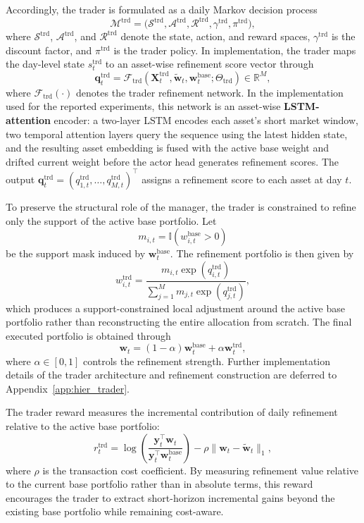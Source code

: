 \documentclass[letterpaper]{article} %
\begin{document}
Accordingly, the trader is formulated as a daily Markov decision process
\[
\mathcal{M}^{\mathrm{trd}}
=
\bigl(
\mathcal{S}^{\mathrm{trd}},
\mathcal{A}^{\mathrm{trd}},
\mathcal{R}^{\mathrm{trd}},
\gamma^{\mathrm{trd}},
\pi^{\mathrm{trd}}
\bigr),
\]
where \(\mathcal{S}^{\mathrm{trd}}\), \(\mathcal{A}^{\mathrm{trd}}\), and \(\mathcal{R}^{\mathrm{trd}}\) denote the state, action, and reward spaces, \(\gamma^{\mathrm{trd}}\) is the discount factor, and \(\pi^{\mathrm{trd}}\) is the trader policy. In implementation, the trader maps the day-level state \(s_t^{\mathrm{trd}}\) to an asset-wise refinement score vector through
\[
\mathbf{q}_t^{\mathrm{trd}}
=
\mathcal{F}_{\mathrm{trd}}
\!\left(
\mathbf{X}_t^{\mathrm{trd}},\tilde{\mathbf{w}}_t,\mathbf{w}_t^{\mathrm{base}};
\Theta_{\mathrm{trd}}
\right)
\in\mathbb{R}^{M},
\]
where \(\mathcal{F}_{\mathrm{trd}}(\cdot)\) denotes the trader refinement network. In the implementation used for the reported experiments, this network is an asset-wise \textbf{LSTM-attention} encoder: a two-layer LSTM encodes each asset's short market window, two temporal attention layers query the sequence using the latest hidden state, and the resulting asset embedding is fused with the active base weight and drifted current weight before the actor head generates refinement scores. The output \(\mathbf{q}_t^{\mathrm{trd}}=(q_{1,t}^{\mathrm{trd}},\dots,q_{M,t}^{\mathrm{trd}})^\top\) assigns a refinement score to each asset at day \(t\).

To preserve the structural role of the manager, the trader is constrained to refine only the support of the active base portfolio. Let
\[
m_{i,t}
=
\mathbb{I}\!\left(w_{i,t}^{\mathrm{base}}>0\right)
\]
be the support mask induced by \(\mathbf{w}_t^{\mathrm{base}}\). The refinement portfolio is then given by
\[
w_{i,t}^{\mathrm{trd}}
=
\frac{
m_{i,t}\exp(q_{i,t}^{\mathrm{trd}})
}{
\sum_{j=1}^{M} m_{j,t}\exp(q_{j,t}^{\mathrm{trd}})
},
\]
which produces a support-constrained local adjustment around the active base portfolio rather than reconstructing the entire allocation from scratch. The final executed portfolio is obtained through
\[
\mathbf{w}_t
=
(1-\alpha)\mathbf{w}_t^{\mathrm{base}}
+
\alpha\mathbf{w}_t^{\mathrm{trd}},
\]
where \(\alpha\in[0,1]\) controls the refinement strength. Further implementation details of the trader architecture and refinement construction are deferred to Appendix~\ref{app:hier_trader}.

The trader reward measures the incremental contribution of daily refinement relative to the active base portfolio:
\[
r_t^{\mathrm{trd}}
=
\log\!\left(
\frac{\mathbf{y}_t^\top \mathbf{w}_t}
{\mathbf{y}_t^\top \mathbf{w}_t^{\mathrm{base}}}
\right)
-
\rho \|\mathbf{w}_t-\tilde{\mathbf{w}}_t\|_1,
\]
where \(\rho\) is the transaction cost coefficient. By measuring refinement value relative to the current base portfolio rather than in absolute terms, this reward encourages the trader to extract short-horizon incremental gains beyond the existing base portfolio while remaining cost-aware.
\end{document}

